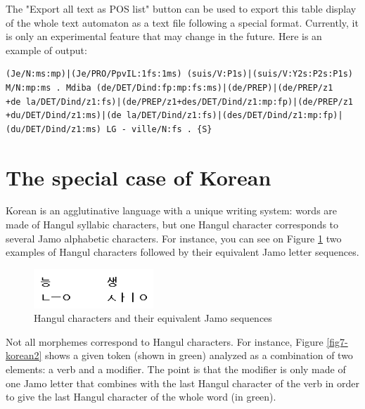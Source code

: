 \bigskip
\noindent The "Export all text as POS list" button can be used to export this table display
of the whole text automaton as a text file following a special format. Currently, it is
only an experimental feature that may change in the future. Here is an example of output:

\begin{verbatim}
(Je/N:ms:mp)|(Je/PRO/PpvIL:1fs:1ms) (suis/V:P1s)|(suis/V:Y2s:P2s:P1s) 
M/N:mp:ms . Mdiba (de/DET/Dind:fp:mp:fs:ms)|(de/PREP)|(de/PREP/z1
+de la/DET/Dind/z1:fs)|(de/PREP/z1+des/DET/Dind/z1:mp:fp)|(de/PREP/z1
+du/DET/Dind/z1:ms)|(de la/DET/Dind/z1:fs)|(des/DET/Dind/z1:mp:fp)|
(du/DET/Dind/z1:ms) LG - ville/N:fs . {S}
\end{verbatim}



\section{The special case of Korean}
\label{section-korean}
Korean is an agglutinative language with a unique writing
system: words are made of Hangul syllabic characters, but one Hangul character
corresponds to several Jamo alphabetic characters. For instance, you can see on
Figure \ref{fig7-korean1} two examples of Hangul characters followed by their
equivalent Jamo letter sequences.

\begin{figure}[!ht]
\begin{center}
\includegraphics[width=4.5cm]{resources/img/fig7-korean1.png}
\caption{Hangul characters and their equivalent Jamo
sequences\label{fig7-korean1}}
\end{center}
\end{figure}

\bigskip
\noindent Not all morphemes correspond to Hangul
characters. For instance, Figure \ref{fig7-korean2} shows a given token
(shown in green) analyzed as a combination of two elements: a verb and
a modifier. The point is that the modifier is only made of one Jamo letter that
combines with the last Hangul character of the verb in order to give the last
Hangul character of the whole word (in green).

